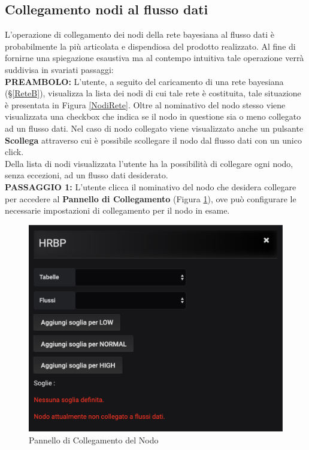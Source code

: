 \subsection{Collegamento nodi al flusso dati}\label{Collegamento}

L'operazione di collegamento dei nodi della rete bayesiana al flusso dati è probabilmente la più articolata e dispendiosa del prodotto realizzato. Al fine di fornirne una spiegazione esaustiva ma al contempo intuitiva tale operazione verrà suddivisa in svariati passaggi:
~\\

\textbf{PREAMBOLO:} L'utente, a seguito del caricamento di una rete bayesiana (§\ref{ReteB}), visualizza la lista dei nodi di cui tale rete è costituita, tale situazione è presentata in Figura \ref{NodiRete}. Oltre al nominativo del nodo stesso viene visualizzata una checkbox che indica se il nodo in questione sia o meno collegato ad un flusso dati. Nel caso di nodo collegato viene visualizzato anche un pulsante \textbf{Scollega} attraverso cui è possibile scollegare il nodo dal flusso dati con un unico click.\\
Della lista di nodi visualizzata l'utente ha la possibilità di collegare ogni nodo, senza eccezioni, ad un flusso dati desiderato.
~\\

\textbf{PASSAGGIO 1:} L'utente clicca il nominativo del nodo che desidera collegare per accedere al \textbf{Pannello di Collegamento} (Figura \ref{PannelloNodo}), ove può configurare le necessarie impostazioni di collegamento per il nodo in esame.

\begin{figure}[H]
	\begin{center}
		\includegraphics[scale=0.6]{./images/PannelloNodo.png}
		 \caption{Pannello di Collegamento del Nodo}	
		 \label{PannelloNodo}
	\end{center}
\end{figure}

